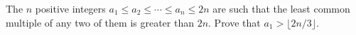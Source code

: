 The $n$ positive integers $a_1 \leq a_2 \leq \cdots \leq a_n \leq 2n$ are such that the least common multiple of any two of them is greater than $2n$. Prove that $a_1 > \lfloor 2n/3 \rfloor$.
